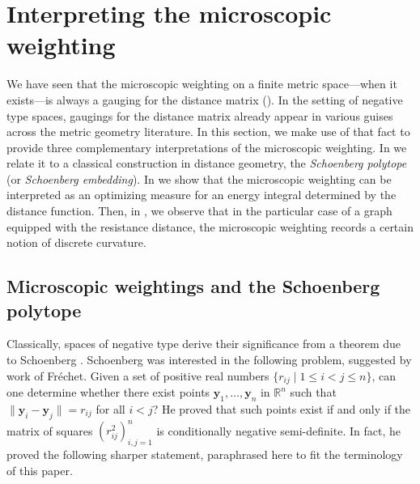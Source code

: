 \documentclass[a4paper, oneside, reqno]{amsart}
\theoremstyle{definition}
\theoremstyle{remark}
\numberwithin{equation}{section}
\renewcommand{\vec}{\mathbf}
\newcommand{\R}{\mathbb{R}}
\begin{document}

\section{Interpreting the microscopic weighting}
\label{sec:geometric_interpretations}

We have seen that the microscopic weighting on a finite metric space---when it exists---is always a gauging for the distance matrix (). In the setting of negative type spaces, gaugings for the distance matrix already appear in various guises across the metric geometry literature. In this section, we make use of that fact to provide three complementary interpretations of the microscopic weighting. In  we relate it to a classical construction in distance geometry, the \emph{Schoenberg polytope} (or \emph{Schoenberg embedding}). In  we show that the microscopic weighting can be interpreted as an optimizing measure for an energy integral determined by the distance function. Then, in , we observe that in the particular case of a graph equipped with the resistance distance, the microscopic weighting records a certain notion of discrete curvature.


\subsection{Microscopic weightings and the Schoenberg polytope}
\label{subsec:schoenberg}

Classically, spaces of negative type derive their significance from a theorem due to Schoenberg \cite{Schoenberg1935}. Schoenberg was interested in the following problem, suggested by work of Fr\'echet. Given a set of positive real numbers \(\{r_{ij} \mid 1 \leq i < j \leq n\}\), can one determine whether there exist points \(\vec{y}_1,\ldots, \vec{y}_n\) in \(\R^{n}\) such that \(\|\vec{y}_i - \vec{y}_j\| = r_{ij}\) for all \(i < j\)? He proved that such points exist if and only if the matrix of squares \((r_{ij}^2)_{i,j=1}^n\) is conditionally negative semi-definite. In fact, he proved the following sharper statement, paraphrased here to fit the terminology of this paper.
\end{document}
